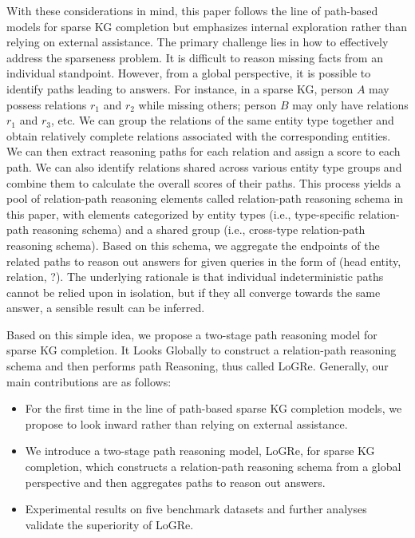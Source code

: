 \documentclass[sigconf]{acmart}
\begin{document}
With these considerations in mind, this paper follows the line of path-based models for sparse KG completion but emphasizes internal exploration rather than relying on external assistance. The primary challenge lies in how to effectively address the sparseness problem. It is difficult to reason missing facts from an individual standpoint. However, from a global perspective, it is possible to identify paths leading to answers. For instance, in a sparse KG, person $A$ may possess relations $r_1$ and $r_2$ while missing others; person $B$ may only have relations $r_1$ and $r_3$, etc. We can group the relations of the same entity type together and obtain relatively complete relations associated with the corresponding entities. We can then extract reasoning paths for each relation and assign a score to each path. We can also identify relations shared across various entity type groups and combine them to calculate the overall scores of their paths. This process yields a pool of relation-path reasoning elements called relation-path reasoning schema in this paper, with elements categorized by entity types (i.e., type-specific relation-path reasoning schema) and a shared group (i.e., cross-type relation-path reasoning schema). Based on this schema, we aggregate the endpoints of the related paths to reason out answers for given queries in the form of (head entity, relation, ?). The underlying rationale is that individual indeterministic paths cannot be relied upon in isolation, but if they all converge towards the same answer, a sensible result can be inferred.

Based on this simple idea, we propose a two-stage path reasoning model for sparse KG completion. It Looks Globally to construct a relation-path reasoning schema and then performs path Reasoning, thus called LoGRe. Generally, our main contributions are as follows:
\begin{itemize}
	\item For the first time in the line of path-based sparse KG completion models, we propose to look inward rather than relying on external assistance.
	\item We introduce a two-stage path reasoning model, LoGRe, for sparse KG completion, which constructs a relation-path reasoning schema from a global perspective and then aggregates paths to reason out answers.
	\item Experimental results on five benchmark datasets and further analyses validate the superiority of LoGRe.
\end{itemize}
\end{document}
